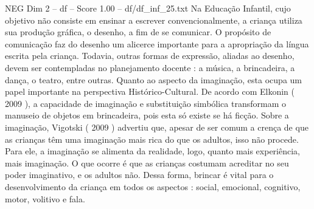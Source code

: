 \begin{textsample}{NEG Dim 2 – df – Score 1.00 – df/df\_inf\_25.txt}
Na Educação Infantil, cujo objetivo não consiste em ensinar a escrever convencionalmente, a criança utiliza sua produção gráfica, o desenho, a fim de se comunicar.
O propósito de comunicação faz do desenho um alicerce importante para a apropriação da língua escrita pela criança.
Todavia, outras formas de expressão, aliadas ao desenho, devem ser contempladas no planejamento docente : a música, a brincadeira, a dança, o teatro, entre outras.
Quanto ao aspecto da imaginação, esta ocupa um papel importante na perspectiva Histórico-Cultural.
De acordo com Elkonin ( 2009 ), a capacidade de imaginação e substituição simbólica transformam o manuseio de objetos em brincadeira, pois esta só existe se há ficção.
Sobre a imaginação, Vigotski ( 2009 ) advertiu que, apesar de ser comum a crença de que as crianças têm uma imaginação mais rica do que os adultos, isso não procede.
Para ele, a imaginação se alimenta da realidade, logo, quanto mais experiência, mais imaginação.
O que ocorre é que as crianças costumam acreditar no seu poder imaginativo, e os adultos não.
Dessa forma, brincar é vital para o desenvolvimento da criança em todos os aspectos : social, emocional, cognitivo, motor, volitivo e fala.

\end{textsample}
